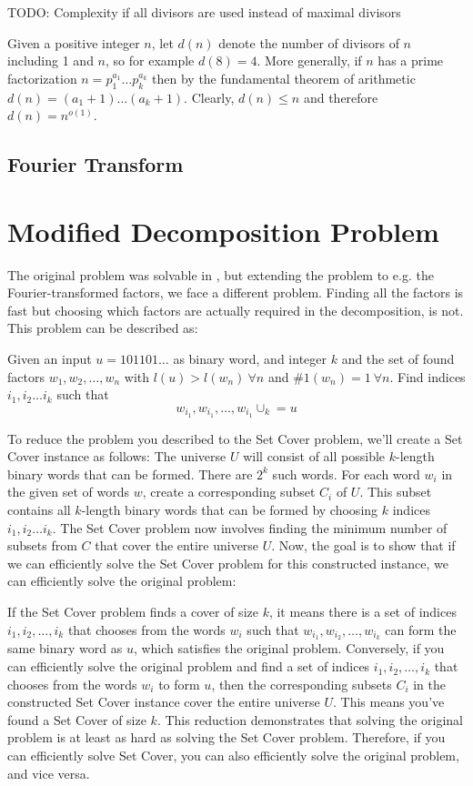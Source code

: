 TODO: Complexity if all divisors are used instead of maximal divisors

Given a positive integer $n$, let $d(n)$ denote the number of divisors of $n$ including 1 and $n$, so for example $d(8)=4$. More generally, if $n$ has a prime factorization $n = p_1^{a_1} \ldots p_k^{a_k}$ then by the fundamental theorem of arithmetic $d(n) = (a_1+1) \ldots (a_k+1)$. Clearly, $d(n) \leq n$ and therefore $d(n) = n^{o(1)}$.  


\subsection{Fourier Transform}


\section{Modified Decomposition Problem}
The original problem was solvable in \LogSpace, but extending the problem to e.g. the Fourier-transformed factors, we face a different problem. Finding all the factors is fast but choosing which factors are actually required in the decomposition, is not. This problem can be described as:

Given an input $u = 101101\dots$ as binary word, and integer $k$ and the set of found factors $w_1, w_2, \dots, w_n$ with $l(u) > l(w_n) ~\forall n$ and $\#1(w_n) = 1 ~\forall n$. Find indices $i_1, i_2 \dots i_k$ such that
\[
w_{i_1}, w_{i_1}, \dots, w_{i_1} \cup_k = u\]

To reduce the problem you described to the Set Cover problem, we'll create a Set Cover instance as follows: The universe $U$ will consist of all possible $k$-length binary words that can be formed. There are $2^k$ such words.
For each word $w_i$ in the given set of words $w$, create a corresponding subset $C_i$ of $U$. This subset contains all $k$-length binary words that can be formed by choosing $k$ indices $i_1, i_2 \dots i_k$. The Set Cover problem now involves finding the minimum number of subsets from $C$ that cover the entire universe $U$. Now, the goal is to show that if we can efficiently solve the Set Cover problem for this constructed instance, we can efficiently solve the original problem:

If the Set Cover problem finds a cover of size $k$, it means there is a set of indices $i_1, i_2, \dots, i_k$ that chooses from the words $w_i$ such that $w_{i_1}, w_{i_2}, \dots, w_{i_k}$ can form the same binary word as $u$, which satisfies the original problem. Conversely, if you can efficiently solve the original problem and find a set of indices $i_1, i_2, \dots, i_k$ that chooses from the words $w_i$ to form $u$, then the corresponding subsets $C_i$ in the constructed Set Cover instance cover the entire universe $U$. This means you've found a Set Cover of size $k$. This reduction demonstrates that solving the original problem is at least as hard as solving the Set Cover problem. Therefore, if you can efficiently solve Set Cover, you can also efficiently solve the original problem, and vice versa.


